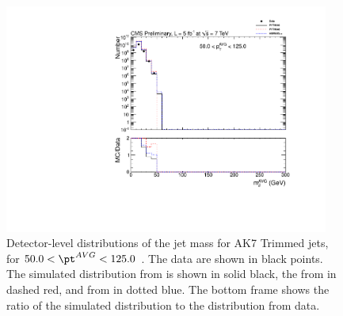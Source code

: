 \fi

\clearpage


\ifnpas

\begin{figure}[htbp]
\centering
\includegraphics[width=0.95\textwidth]{figs/histAK7MjetVsPtAvg_rawDataMCComparisons_pt_1_Trimmed}
\caption{Detector-level distributions of the jet mass for AK7 Trimmed jets,
for $50.0 < \pt^{AVG} < 125.0$ \GeVc. The data are shown in black points.
The simulated distribution from \PYTHIA is shown in solid black, 
the from \PYTHIAEIGHT in dashed red, and from \HERWIG in dotted blue. 
The bottom frame shows the ratio of the simulated distribution
to the distribution from data. 
\label{figs:histAK7MjetVsPtAvg_rawDataMCComparisons_pt_1_Trimmed}}
\end{figure}

\fi

